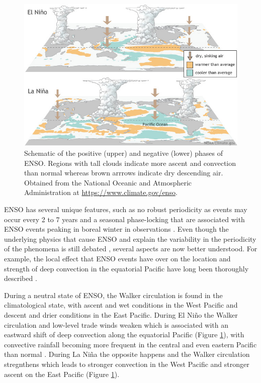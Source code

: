 \begin{figure}[t!]
\centering
\includegraphics[width=\linewidth]{figures/ENSO}
\caption{Schematic of the positive (upper) and negative (lower) phases of ENSO. Regions with tall clouds indicate more ascent and convection than normal whereas brown arrrows indicate dry descending air. Obtained from the National Oceanic and Atmospheric Administration at \url{https://www.climate.gov/enso}. }
\label{fig:enso}
\end{figure}  
 ENSO has several unique features, such as no robust periodicity as events may occur every 2 to 7 years and a seasonal phase-locking that are associated with ENSO events peaking in boreal winter in observations \citep{wang2004}. Even though the underlying physics that cause ENSO and explain the variability in the periodicity of the phenomena is still debated \citep{wang2004,christensen2017}, several aspects are now better understood. 
For example, the local effect that ENSO events have over on the location and strength of deep convection in the equatorial Pacific have long been thoroughly described \citep{trenberth1997,neelin1998}. 

During a neutral state of ENSO, the Walker circulation is found in the climatological state, with ascent and wet conditions in the West Pacific  and descent and drier conditions in the East Pacific. During El Niño the Walker circulation and low-level trade winds weaken which is associated with an eastward shift of deep convection along the equatorial Pacific (Figure \ref{fig:enso}), with convective rainfall becoming more frequent in the central and even eastern Pacific than normal \citep{neelin1998,wang2004}. During La Niña the opposite happens and the Walker circulation stregnthens which leads to stronger convection in the West Pacific and stronger ascent on the East Pacific (Figure \ref{fig:enso}). 


